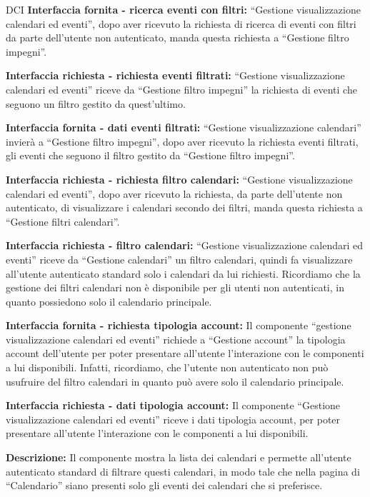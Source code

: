 \begin{listaPersonale}{DCI}
    \textbf{Interfaccia fornita - ricerca eventi con filtri:} “Gestione visualizzazione calendari ed eventi”, dopo aver ricevuto la richiesta di ricerca di eventi con filtri da parte dell'utente non autenticato, manda questa richiesta a “Gestione filtro impegni”.

    \textbf{Interfaccia richiesta - richiesta eventi filtrati:} “Gestione visualizzazione calendari ed eventi” riceve da “Gestione filtro impegni” la richiesta di eventi che seguono un filtro gestito da quest'ultimo.

    \textbf{Interfaccia fornita - dati eventi filtrati:} “Gestione visualizzazione calendari” invierà  a “Gestione filtro impegni”, dopo aver ricevuto la richiesta eventi filtrati, gli eventi che seguono il filtro gestito da “Gestione filtro impegni”.

    \textbf{Interfaccia richiesta - richiesta filtro calendari:} “Gestione visualizzazione calendari ed eventi”, dopo aver ricevuto la richiesta, da parte dell'utente non autenticato, di visualizzare i calendari secondo dei filtri, manda questa richiesta a “Gestione filtri calendari”.

    \textbf{Interfaccia richiesta - filtro calendari:} “Gestione visualizzazione calendari ed eventi” riceve da “Gestione calendari” un filtro calendari, quindi fa visualizzare all'utente autenticato standard solo i calendari da lui richiesti. Ricordiamo che la gestione dei filtri calendari non è disponibile per gli utenti non autenticati, in quanto possiedono solo il calendario principale.

    \textbf{Interfaccia fornita - richiesta tipologia account:} Il componente “gestione visualizzazione calendari ed eventi” richiede a “Gestione account”  la tipologia account dell'utente per poter presentare all'utente l'interazione con le componenti a lui disponibili. Infatti, ricordiamo, che l'utente non autenticato non può usufruire del filtro calendari in quanto può avere solo il calendario principale.

    \textbf{Interfaccia richiesta - dati tipologia account:} Il componente “Gestione visualizzazione calendari ed eventi” riceve i dati tipologia account, per poter presentare all'utente l'interazione con le componenti a lui disponibili.



    \textbf{Descrizione:} Il componente mostra la lista dei calendari e permette all'utente autenticato standard di filtrare questi calendari, in modo tale che nella pagina di “Calendario” siano presenti solo gli eventi dei calendari che si preferisce.


\end{listaPersonale}
